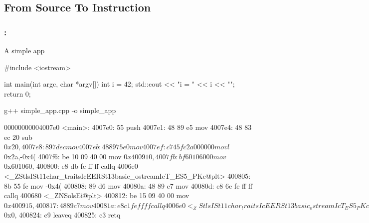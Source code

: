 \documentclass[9pt,xcolor=table]{beamer}
\begin{document}
\subsection{From Source To Instruction}
\begin{frame}[fragile]
\frametitle{\insertsectionhead{}: \insertsubsection{}}
\begin{block}{A simple app}
  \begin{pyglist}[language=c++,numbers=left,style=emacs]
  #include <iostream>

  int main(int argc, char *argv[])
  {
    int i = 42;
    std::cout << "i = " << i << "\n";
    return 0;
  }
  \end{pyglist}
\end{block}

\begin{block}{g++ simple_app.cpp -o simple_app}
  \begin{pyglist}[language=assembly,numbers=left,style=emacs]
    00000000004007e0 <main>:
    4007e0:	55                   	push   %
    4007e1:	48 89 e5             	mov    %
    4007e4:	48 83 ec 20          	sub    $0x20,%
    4007e8:	89 7d ec             	mov    %
    4007eb:	48 89 75 e0          	mov    %
    4007ef:	c7 45 fc 2a 00 00 00 	movl   $0x2a,-0x4(%
    4007f6:	be 10 09 40 00       	mov    $0x400910,%
    4007fb:	bf 60 10 60 00       	mov    $0x601060,%
    400800:	e8 db fe ff ff       	callq  4006e0 <_ZStlsISt11char_traitsIcEERSt13basic_ostreamIcT_ES5_PKc@plt>
    400805:	8b 55 fc             	mov    -0x4(%
    400808:	89 d6                	mov    %
    40080a:	48 89 c7             	mov    %
    40080d:	e8 6e fe ff ff       	callq  400680 <_ZNSolsEi@plt>
    400812:	be 15 09 40 00       	mov    $0x400915,%
    400817:	48 89 c7             	mov    %
    40081a:	e8 c1 fe ff ff       	callq  4006e0 <_ZStlsISt11char_traitsIcEERSt13basic_ostreamIcT_ES5_PKc@plt>
    40081f:	b8 00 00 00 00       	mov    $0x0,%
    400824:	c9                   	leaveq 
    400825:	c3                   	retq
  \end{pyglist}
  
\end{block}
\end{frame}
\end{document}
